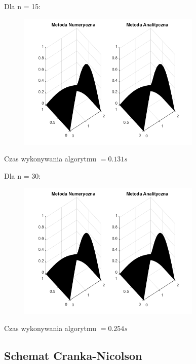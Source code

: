 Dla n = 15:

\begin{figure}[!ht]
	\begin{center}
		\includegraphics[width=0.78\textwidth]{Lab7/charts/btcs/15.png}
	\end{center}
\end{figure}

Czas wykonywania algorytmu $ = 0.131 s$

\newpage

Dla n = 30:

\begin{figure}[!ht]
	\begin{center}
		\includegraphics[width=0.78\textwidth]{Lab7/charts/btcs/30.png}
	\end{center}
\end{figure}

Czas wykonywania algorytmu $ = 0.254 s$

\subsection{Schemat Cranka-Nicolson}

